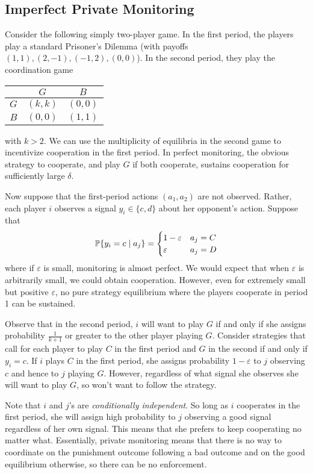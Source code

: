 \documentclass[10pt]{article}
\begin{document}
\subsection{Imperfect Private Monitoring}

\begin{example}
	Consider the following simply two-player game. In the first period, the players play a standard Prisoner's Dilemma (with payoffs $(1,1), (2,-1), (-1,2), (0,0)$). In the second period, they play the coordination game 
	\begin{center}
		\begin{tabular}{c|cc}
			& $G$ & $B$ \\\hline
			$G$ & $(k,k)$ & $(0,0)$ \\
			$B$ & $(0,0)$ & $(1,1)$
		\end{tabular}
	\end{center}
	with $k > 2$. We can use the multiplicity of equilibria in the second game to incentivize cooperation in the first period. In perfect monitoring, the obvious strategy to cooperate, and play $G$ if both cooperate, sustains cooperation for sufficiently large $\delta$.
	
	Now suppose that the first-period actions $(a_1,a_2)$ are not observed. Rather, each player $i$ observes a signal $y_i \in \{c,d\}$ about her opponent's action. Suppose that \[\mathbb{P}\{y_i = c \mid a_j\} = \begin{cases} 1 - \varepsilon & a_j = C \\ \varepsilon & a_j = D\end{cases}\]where if $\varepsilon$ is small, monitoring is almost perfect. We would expect that when $\varepsilon$ is arbitrarily small, we could obtain cooperation. However, even for extremely small but positive $\varepsilon$, no pure strategy equilibrium where the players cooperate in period 1 can be sustained.
	
	Observe that in the second period, $i$ will want to play $G$ if and only if she assigns probability $\frac{1}{k+1}$ or greater to the other player playing $G$. Consider strategies that call for each player to play $C$ in the first period and $G$ in the second if and only if $y_i = c$. If $i$ plays $C$ in the first period, she assigns probability $1-\varepsilon$ to $j$ observing $c$ and hence to $j$ playing $G$. However, regardless of what signal she observes she will want to play $G$, so won't want to follow the strategy. 
	
	\begin{remark}
		Note that $i$ and $j$'s are \emph{conditionally independent}. So long as $i$ cooperates in the first period, she will assign high probability to $j$ observing a good signal regardless of her own signal. This means that she prefers to keep cooperating no matter what. Essentially, private monitoring means that there is no way to coordinate on the punishment outcome following a bad outcome and on the good equilibrium otherwise, so there can be no enforcement.
	\end{remark}
	

\end{example}
\end{document}
